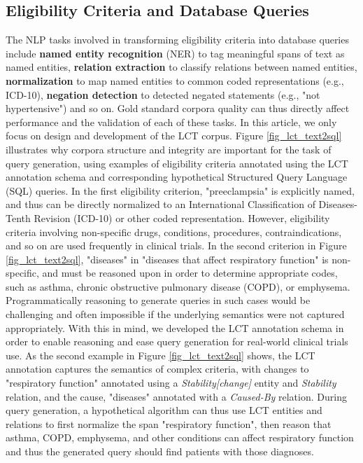 \documentclass[fleqn,10pt]{wlscirep}
\begin{document}
\subsection*{Eligibility Criteria and Database Queries}
\noindent The NLP tasks involved in transforming eligibility criteria into database queries include \textbf{named entity recognition} (NER) to tag meaningful spans of text as named entities, \textbf{relation extraction} to classify relations between named entities, \textbf{normalization} to map named entities to common coded representations (e.g., ICD-10), \textbf{negation detection} to detected negated statements (e.g., "not hypertensive") and so on. Gold standard corpora quality can thus directly affect performance and the validation of each of these tasks. In this article, we only focus on design and development of the LCT corpus. Figure \ref{fig_lct_text2sql} illustrates why corpora structure and integrity are important for the task of query generation, using examples of eligibility criteria annotated using the LCT annotation schema and corresponding hypothetical Structured Query Language (SQL) queries. In the first eligibility criterion, "preeclampsia" is explicitly named, and thus can be directly normalized to an International Classification of Diseases-Tenth Revision (ICD-10) or other coded representation. However, eligibility criteria involving non-specific drugs, conditions, procedures, contraindications, and so on are used frequently in clinical trials. In the second criterion in Figure \ref{fig_lct_text2sql}, "diseases" in "diseases that affect respiratory function" is non-specific, and must be reasoned upon in order to determine appropriate codes, such as asthma, chronic obstructive pulmonary disease (COPD), or emphysema.  Programmatically reasoning to generate queries in such cases would be challenging and often impossible if the underlying semantics were not captured appropriately. With this in mind, we developed the LCT annotation schema in order to enable reasoning and ease query generation for real-world clinical trials use. As the second example in Figure \ref{fig_lct_text2sql} shows, the LCT annotation captures the semantics of complex criteria, with changes to "respiratory function" annotated using a \textit{Stability[change]} entity and \textit{Stability} relation, and the cause, "diseases" annotated with a \textit{Caused-By} relation. During query generation, a hypothetical algorithm can thus use LCT entities and relations to first normalize the span "respiratory function", then reason that asthma, COPD, emphysema, and other conditions can affect respiratory function and thus the generated query should find patients with those diagnoses.
\end{document}
